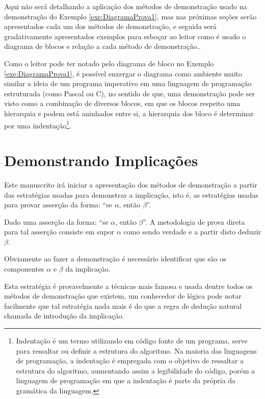Aqui não será detalhando a aplicação dos métodos de demonstração usado na demonstração do Exemplo \ref{exe:DiagramaProva1}, mas nas próximas seções serão apresentados cada um dos métodos de demonstração, e seguida será gradativamente apresentados exemplos para esboçar ao leitor como é usado o diagrama de blocos e relação a cada método de demonstração..

Como o leitor pode ter notado pelo diagrama de bloco no Exemplo \ref{exe:DiagramaProva1}, é possível enxergar o diagrama como ambiente muito similar a ideia de um programa imperativo em uma linguagem de programação estruturada (como Pascal ou C), no sentido de que, uma demonstração pode ser visto como a combinação de diversos blocos, em que os blocos respeito uma hierarquia e podem está aninhados entre si, a hierarquia dos bloco é determinar por uma indentação\footnote{Indentação é um termo utilizando em código fonte de um programa, serve para ressaltar ou definir a estrutura do algoritmo. Na maioria das linguagens de programação, a indentação é empregada com o objetivo de ressaltar a estrutura do algoritmo, aumentando assim a legibilidade do código, porém a linguagem de programação em que a indentação é parte da própria da gramática da linguagem.}. 

\section{Demonstrando Implicações}\label{sec:DemonstrandoImplicacoes}

Este manuscrito irá iniciar a apresentação dos métodos de demonstração a partir das estratégias usadas para demonstrar a implicação, isto é, as estratégias usadas para provar asserção da forma: ``se $\alpha$, então $\beta$''.

\begin{definition}
	Dado uma asserção da forma: ``se $\alpha$, então $\beta$''. A metodologia de prova direta para tal asserção consiste em supor $\alpha$ como sendo verdade e a partir disto deduzir $\beta$.
\end{definition}

\begin{remark}
	Obviamente ao fazer a demonstração é necessário identificar que são os componentes $\alpha$ e $\beta$ da implicação.
\end{remark}

Esta estratégia é provavelmente a técnicas mais famosa e usada dentre todos os métodos de demonstração que existem, um conhecedor de lógica pode notar facilmente que tal estratégia nada mais é do que a regra de dedução natural chamada de introdução da implicação\cite{joaoPavao2014}. 

